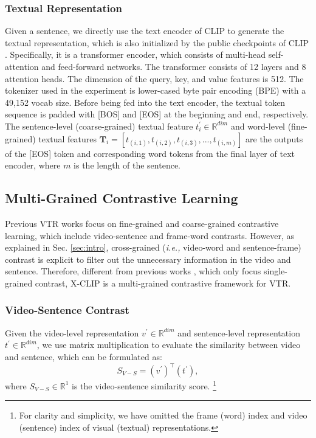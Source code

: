 \documentclass[sigconf]{acmart}
\begin{document}
\subsubsection{Textual Representation}
Given a sentence, we directly use the text encoder of CLIP to generate the textual representation, which is also initialized by the public checkpoints of CLIP \cite{radford2021learning}. Specifically, it is a transformer encoder, which consists of multi-head self-attention and feed-forward networks. The transformer consists of 12 layers and 8 attention heads. The dimension of the query, key, and value features is 512. The tokenizer used in the experiment is lower-cased byte pair encoding (BPE) \cite{sennrich2015neural} with a 49,152 vocab size. Before being fed into the text encoder, the textual token sequence is padded with [BOS] and [EOS] at the beginning and end, respectively. The sentence-level (coarse-grained) textual feature $t^{\prime}_i \in \mathbb{R}^{dim}$ and word-level (fine-grained) textual features $\mathbf{T}_i=[t_{(i,1)},t_{(i,2)},t_{(i,3)},...,t_{(i,m)}]$ are the outputs of the [EOS] token and corresponding word tokens from the final layer of text encoder, where $m$ is the length of the sentence.




\subsection{Multi-Grained Contrastive Learning} \label{sec:multigraied}

Previous VTR works \cite{luo2021clip4clip,lee2018stacked} focus on fine-grained and coarse-grained contrastive learning, which include video-sentence and frame-word contrasts. However, as explained in Sec. \ref{sec:intro}, cross-grained (\emph{i.e.,} video-word and sentence-frame) contrast is explicit to filter out the unnecessary information in the video and sentence. Therefore, different from previous works \cite{luo2021clip4clip,lee2018stacked,yao2021filip}, which only focus single-grained contrast, X-CLIP is a multi-grained contrastive framework for VTR.

\subsubsection{Video-Sentence Contrast}

Given the video-level representation $v^{\prime} \in \mathbb{R}^{dim}$ and sentence-level representation $t^{\prime} \in \mathbb{R}^{dim}$, we use matrix multiplication to evaluate the similarity between video and sentence, which can be formulated as:
\begin{equation} 
    S_{V-S}=(v^{\prime})^\intercal (t^{\prime}),
\label{eq:video_sentence_simi}
\end{equation}
where $S_{V-S} \in \mathbb{R}^1$ is the video-sentence similarity score. \footnote{For clarity and simplicity, we have omitted the frame (word) index and video (sentence) index of visual (textual) representations.}
\end{document}
